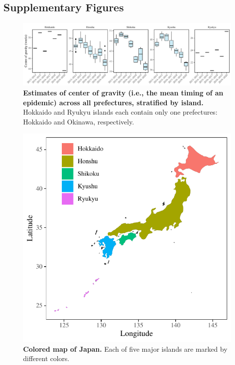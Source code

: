 \documentclass[12pt]{article}
\begin{document}
\pagebreak

\subsection*{Supplementary Figures}

\begin{figure}[!pth]
\includegraphics[width=\textwidth]{../figure/figure1_cog.pdf}
\caption{
\textbf{Estimates of center of gravity (i.e., the mean timing of an epidemic) across all prefectures, stratified by island.}
Hokkaido and Ryukyu islands each contain only one prefectures: Hokkaido and Okinawa, respectively.
}
\end{figure}



\begin{figure}[!pth]
\includegraphics[width=\textwidth]{../figure/figure_map.pdf}
\caption{
\textbf{Colored map of Japan.}
Each of five major islands are marked by different colors.
}
\end{figure}
\end{document}

